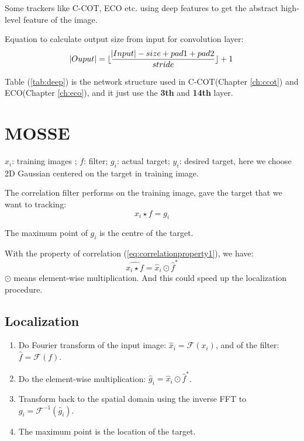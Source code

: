 \documentclass[12pt]{article}
\numberwithin{equation}{section}
\begin{document}
Some trackers like C-COT, ECO etc. using deep features\cite{Goodfellow-et-al-2016-Book} to get the abstract high-level feature of the image. \par
Equation to calculate output size from input for convolution layer:
\begin{equation}
	\abs{Ouput} = \lfloor{\frac{\abs{Input} - size + pad1 + pad2}{stride}}\rfloor + 1
\end{equation}	 \par
Table (\ref{tab:deep}) is the network structure used in C-COT(Chapter \ref{ch:ccot}) and ECO(Chapter \ref{ch:eco}), and it just use the \textbf{3th} and \textbf{14th} layer. \par
\section{MOSSE \cite{bolme2010visual}}
$x_i$: training images ; $f$: filter; $g_i$: actual target; $y_i$: desired target, here we choose 2D Gaussian centered on the target in training image. \par
The correlation filter performs on the training image, gave the target that we want to tracking:
\begin{equation}
	x_i \star f = g_i
\end{equation}\par
The maximum point of $g_i$ is the centre of the target. \par
With the property of correlation (\ref{eq:correlationproperty1}), we have:
\begin{equation}
	\widehat{x_i \star f} = \hat{x}_i \odot \hat{f}^*
\end{equation}
$\odot$ means element-wise multiplication. And this could speed up the localization procedure.\par
\subsection{Localization}
\begin{enumerate}
	\item Do Fourier transform of the input image: $\hat{x}_i=\mathcal{F}(x_i)$, and of the filter: $\hat{f}=\mathcal{F}(f)$. \par
	\item Do the element-wise multiplication: $\hat{g}_i =\hat{x}_i \odot \hat{f}^*$. \par
	\item Transform back to the spatial domain using the inverse FFT to $g_i=\mathcal{F}^{-1}(\hat{g}_i)$. \par
	\item The maximum point is the location of the target.
\end{enumerate}
\end{document}
